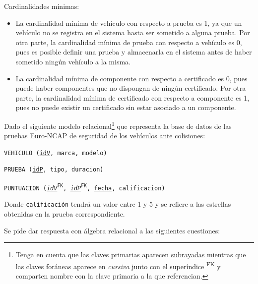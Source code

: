 \documentclass[
    12pt,
    a4paper,
    addpoints,
    answers,
    convocatoria=ext,
    titulacion=NoCD,
    curso=2024/2025,
]{db-exam}
\begin{document}
\begin{questions}
\begin{solution}[50em]
Cardinalidades mínimas:
\begin{itemize}
    \item La cardinalidad mínima de vehículo con respecto a prueba es 1, ya que un vehículo no se registra en el sistema hasta ser sometido a alguna prueba. Por otra parte, la cardinalidad mínima de prueba con respecto a vehículo es 0, pues es posible definir una prueba y almacenarla en el sistema antes de haber sometido ningún vehículo a la misma.
    \item La cardinalidad mínima de componente con respecto a certificado es 0, pues puede haber componentes que no dispongan de ningún certificado. Por otra parte, la cardinalidad mínima de certificado con respecto a componente es 1, pues no puede existir un certificado sin estar asociado a un componente.
\end{itemize}
\end{solution}

\newpage
\question[1\half] Dado el siguiente modelo relacional\footnote{Tenga en cuenta que las claves primarias aparecen \underline{subrayadas} mientras que las claves foráneas aparece en \textit{cursiva} junto con el superíndice \textsuperscript{FK} y comparten nombre con la clave primaria a la que referencian.} que representa la base de datos de las pruebas Euro-NCAP de seguridad de los vehículos ante colisiones:

\texttt{VEHICULO (\underline{idV}, marca, modelo)}

\texttt{PRUEBA (\underline{idP}, tipo, duracion)}

\texttt{PUNTUACION (\underline{\textit{idV}}\textsuperscript{FK}, \underline{\textit{idP}}\textsuperscript{FK}, \underline{fecha}, calificacion)} 

Donde \texttt{calificación} tendrá un valor entre 1 y 5 y se refiere a las estrellas obtenidas en la prueba correspondiente.

Se pide dar respuesta con álgebra relacional a las siguientes cuestiones:
\end{questions}
\end{document}
